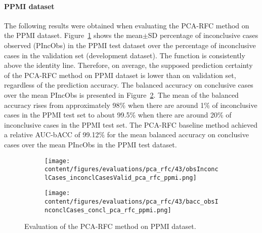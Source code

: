 


\paragraph{PPMI dataset}

The following results were obtained when evaluating the PCA-RFC method on the PPMI dataset.
Figure~\ref{fig:obsInconclCases_inconclCasesValid_pca_rfc_ppmi} shows the
mean$\pm$SD percentage of inconclusive cases observed (PIncObs) in the PPMI test dataset 
over the percentage of inconclusive cases in the validation set (development dataset).
The function is consistently above the identity line.
Therefore, on average, the supposed prediction certainty of the PCA-RFC method on PPMI dataset is lower than on validation set,
regardless of the prediction accuracy.
The balanced accuracy on conclusive cases over the mean PIncObs is presented 
in Figure~\ref{fig:bacc_obsInconclCases_concl_pca_rfc_ppmi}.
The mean of the balanced accuracy rises from approximately 98\% 
when there are around 1\% of inconclusive cases in the PPMI test set to about 99.5\% 
when there are around 20\% of inconclusive cases in the PPMI test set.
The PCA-RFC baseline method achieved a relative AUC-bACC of 99.12\% for the mean balanced accuracy on conclusive cases 
over the mean PIncObs in the PPMI test dataset.

\begin{figure}[ht]
  \begin{subfigure}{0.49\textwidth}
    \centering
    \texttt{[image: content/figures/evaluations/pca\_rfc/43/obsInconclCases\_inconclCasesValid\_pca\_rfc\_ppmi.png]}
    \label{fig:obsInconclCases_inconclCasesValid_pca_rfc_ppmi}
  \end{subfigure}
  \hfill
  \begin{subfigure}{0.49\textwidth}
    \centering
    \texttt{[image: content/figures/evaluations/pca\_rfc/43/bacc\_obsInconclCases\_concl\_pca\_rfc\_ppmi.png]}
    \label{fig:bacc_obsInconclCases_concl_pca_rfc_ppmi}
  \end{subfigure}
  \caption{Evaluation of the PCA-RFC method on PPMI dataset.}
  \label{fig:perf_results_rfc_ppmi}
\end{figure}



